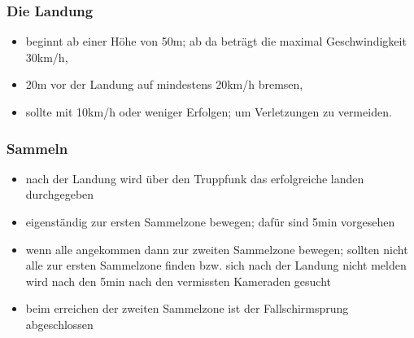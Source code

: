 \subsubsection{Die Landung}
	\begin{itemize}
		\item beginnt ab einer Höhe von 50m; ab da beträgt die maximal Geschwindigkeit 30km/h,
		\item 20m vor der Landung auf mindestens 20km/h bremsen,
		\item sollte mit 10km/h oder weniger Erfolgen; um Verletzungen zu vermeiden.
	\end{itemize}

\subsubsection{Sammeln}
	\begin{itemize}
		\item nach der Landung wird über den Truppfunk das erfolgreiche landen durchgegeben
		\item eigenständig zur ersten Sammelzone bewegen; dafür sind 5min vorgesehen
		\item wenn alle angekommen dann zur zweiten Sammelzone bewegen; sollten nicht alle zur ersten Sammelzone finden bzw. sich nach der Landung nicht melden wird nach den 5min nach den vermissten Kameraden gesucht
		\item beim erreichen der zweiten Sammelzone ist der Fallschirmsprung abgeschlossen
	\end{itemize}
	